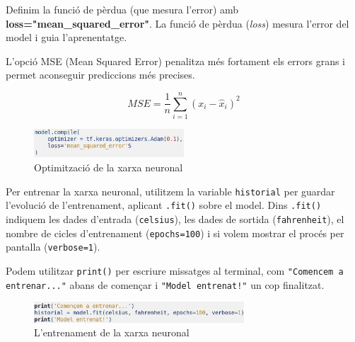 Definim la funció de pèrdua (que mesura l'error) amb \textbf{loss="mean\_squared\_error"}. La funció de pèrdua (\textit{loss}) mesura l’error del model i guia l’aprenentatge.

L’opció MSE (Mean Squared Error) penalitza més fortament els errors grans i permet aconseguir prediccions més precises.

$$ MSE = \frac{1}{n} \sum_{i=1}^n \left( x_i - \widehat{x}_i\right)^2$$






\begin{figure}[H]

\centering

\includegraphics[width=0.5\textwidth]{./figures/4.png}

\caption{Optimització de la xarxa neuronal}

\end{figure}

Per entrenar la xarxa neuronal, utilitzem la variable \texttt{historial} per guardar l’evolució de l’entrenament, aplicant \texttt{.fit()} sobre el model. Dins \texttt{.fit()} indiquem les dades d’entrada (\texttt{celsius}), les dades de sortida (\texttt{fahrenheit}), el nombre de cicles d’entrenament (\texttt{epochs=100}) i si volem mostrar el procés per pantalla (\texttt{verbose=1}).

Podem utilitzar \texttt{print()} per escriure missatges al terminal, com \texttt{"\hspace{0truecm}Comencem a entrenar..."} abans de començar i \texttt{"Model entrenat!"} un cop finalitzat.

\begin{figure}[H]

\centering

\includegraphics[width=0.7\textwidth]{./figures/6.png}

\caption{L’entrenament de la xarxa neuronal}

\end{figure}

